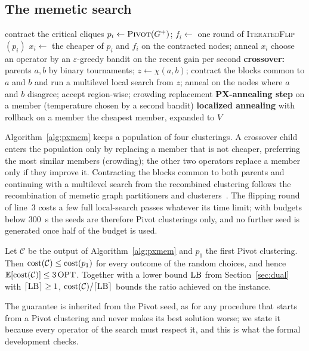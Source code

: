\subsection{The memetic search}

\begin{algorithm}[t]
\caption{PXMem$(G^+,T)$}\label{alg:pxmem}
\begin{algorithmic}[1]
\State contract the critical cliques
  \State $p_i\gets\textsc{Pivot}(G^+)$; $f_i\gets$ one round of \textsc{IteratedFlip}$(p_i)$
  \State $x_i\gets$ the cheaper of $p_i$ and $f_i$ on the contracted nodes; anneal $x_i$
\EndFor
{}
  \State choose an operator by an $\varepsilon$-greedy bandit on the recent gain per second
  \State \textbf{crossover:} parents $a,b$ by binary tournaments; $z\gets\chi(a,b)$;
  \Statex \hspace{\algorithmicindent} contract the blocks common to $a$ and $b$ and run a multilevel local search from $z$;
  \Statex \hspace{\algorithmicindent} anneal on the nodes where $a$ and $b$ disagree; accept region-wise; crowding replacement
  \State \textbf{PX-annealing step} on a member (temperature chosen by a second bandit)
  \State \textbf{localized annealing} with rollback on a member
\EndWhile
\State \Return the cheapest member, expanded to $V$
\end{algorithmic}
\end{algorithm}

Algorithm~\ref{alg:pxmem} keeps a population of four clusterings.  A crossover
child enters the population only by replacing a member that is not cheaper,
preferring the most similar members (crowding); the other two operators
replace a member only if they improve it.  Contracting the blocks common to
both parents and continuing with a multilevel search from the recombined
clustering follows the recombination of memetic graph partitioners and
clusterers~\citep{SandersS12kaffpae,BiedermannHSS18memetic,hausberger2025scc}.  The flipping round of line~3 costs a few
full local-search passes whatever its time limit; with budgets below
\SI{300}{s} the seeds are therefore Pivot clusterings only, and no further seed
is generated once half of the budget is used.

\begin{theorem}\label{thm:pxmem}
Let $\mathcal C$ be the output of Algorithm~\ref{alg:pxmem} and $p_1$ the first
Pivot clustering.  Then $\mathrm{cost}(\mathcal C)\le\mathrm{cost}(p_1)$ for every outcome of
the random choices, and hence $\mathbb E[\mathrm{cost}(\mathcal C)]\le3\,\mathrm{OPT}$.  Together
with a lower bound $\mathrm{LB}$ from Section~\ref{sec:dual} with $\lceil\mathrm{LB}\rceil\ge1$,
$\mathrm{cost}(\mathcal C)/\lceil\mathrm{LB}\rceil$ bounds the ratio achieved on the instance.
\end{theorem}
The guarantee is inherited from the Pivot seed, as for any procedure that
starts from a Pivot clustering and never makes its best solution worse; we state
it because every operator of the search must respect it, and this is what the
formal development checks.

